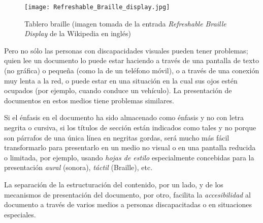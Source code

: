 \begin{figure} \centering

\texttt{[image: Refreshable\_Braille\_display.jpg]} \caption{Tablero braille (imagen tomada de la entrada \emph{Refreshable Braille Display} de la Wikipedia en inglés)} \end{figure} 

Pero no sólo las personas con discapacidades visuales pueden tener problemas; quien lee un documento lo puede estar haciendo a través de una pantalla de texto (no gráfica) o pequeña (como la de un teléfono móvil), o a través de una conexión muy lenta a la red, o puede estar en una situación en la cual sus ojos estén ocupados (por ejemplo, cuando conduce un vehículo). La presentación de documentos en estos medios tiene problemas similares. 

Si el énfasis en el documento ha sido almacenado como énfasis y no con letra negrita o cursiva, si los títulos de sección están indicados como tales y no porque son párrafos de una única línea en negritas gordas, será mucho más fácil transformarlo para presentarlo en un medio no visual o en una pantalla reducida o limitada, por ejemplo, usando \emph{hojas de estilo} especialmente concebidas para la presentación \emph{aural} (sonora), \emph{táctil} (Braille), etc. 

La separación de la estructuración del contenido, por un lado, y de los mecanismos de presentación del documento, por otro, facilita la \emph{accesibilidad} al documento a través de varios medios a personas discapacitadas o en situaciones especiales. 

